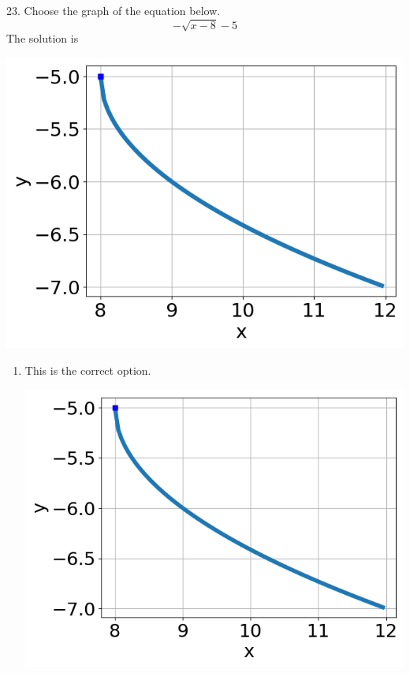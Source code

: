 \documentclass{article}[10pt]
\begin{document}
23. Choose the graph of the equation below.
$$ - \sqrt{x - 8} - 5 $$ 
The solution is  
\begin{center}\includegraphics[scale=0.5]{../Figures/question23AD.png}\end{center}\begin{enumerate}[label=\Alph*.] 
\item This is the correct option. 
\begin{center}\includegraphics[scale=0.5]{../Figures/question23AD.png}\end{center} 
 

\end{enumerate}
\end{document}
